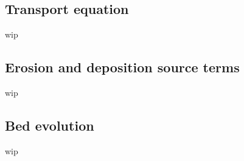\subsection{Transport equation}
wip

\subsection{Erosion and deposition source terms}
wip

\subsection{Bed evolution}
wip


